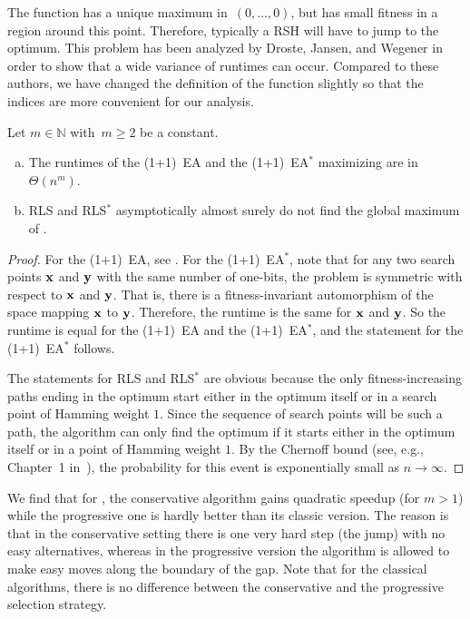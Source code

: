 \documentclass[a4paper,11pt]{article}
\begin{document}
The function has a unique maximum in~$(0,\ldots,0)$, but has small fitness in a region around this point. Therefore, typically a RSH will have to jump to the optimum. This problem has been analyzed by Droste, Jansen, and Wegener \cite{djwea02} in order to show that a wide variance of runtimes can occur. Compared to these authors, we have changed the definition of the function slightly so that the indices are more convenient for our analysis.


\begin{theorem}\label{thm:jumpclassic}
Let $m\in\mathbb{N}$ with~$m\ge 2$ be a constant.
\begin{enumerate}[(a)]
\item  The runtimes of the (1+1)~EA and the (1+1)~EA$^*$ maximizing \jumpm are in $\Theta(n^m)$.
\item RLS and RLS$^*$ asymptotically almost surely do not find the global maximum of \jumpm.
\end{enumerate}
\end{theorem}
\begin{proof}
For the (1+1)~EA, see \cite{djwea02}. For the (1+1)~EA$^*$, note that for any two search points $\xvec$ and $\yvec$ with the same number of one-bits, the problem is symmetric with respect to $\xvec$ and $\yvec$. That is, there is a fitness-invariant automorphism of the space mapping $\xvec$ to $\yvec$. Therefore, the runtime is the same for $\xvec$ and $\yvec$. So the runtime is equal for the (1+1)~EA and the (1+1)~EA$^*$, and the statement for the (1+1)~EA$^*$ follows.

The statements for RLS and RLS$^*$ are obvious because the only fitness-increasing paths ending in the optimum start either in the optimum itself or in a search point of Hamming weight $1$. Since the sequence of search points will be such a path, the algorithm can only find the optimum if it starts either in the optimum itself or in a point of Hamming weight $1$. By the Chernoff bound (see, e.g., Chapter~1 in~\cite{DoerrA11}), the probability for this event is exponentially small as $n\rightarrow \infty$.
\end{proof}

We find that for \jumpm, the conservative algorithm gains quadratic speedup (for $m>1$) while the progressive one is hardly better than its classic version. The reason is that in the conservative setting there is one very hard step (the jump) with no easy alternatives, whereas in the progressive version the algorithm is allowed to make easy moves along the boundary of the gap. Note that for the classical algorithms, there is no difference between the conservative and the progressive selection strategy.
\end{document}
